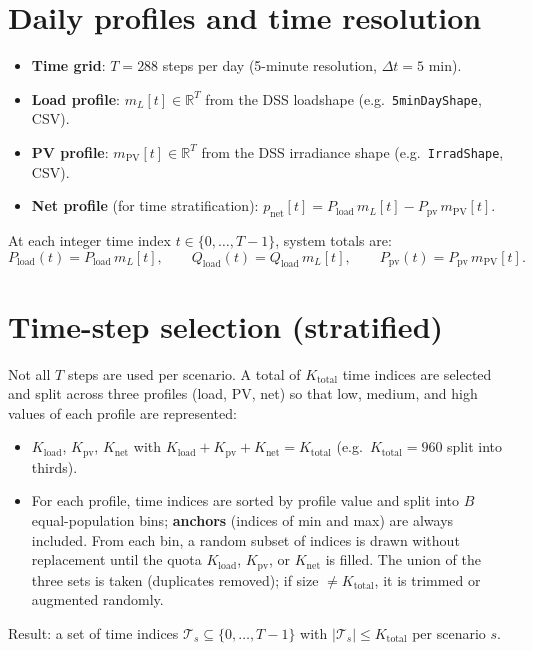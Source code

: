 \documentclass[11pt]{article}
\begin{document}
\section{Daily profiles and time resolution}

\begin{itemize}[noitemsep]
  \item \textbf{Time grid}: $T = 288$ steps per day (5-minute resolution, $\Delta t = 5$ min).
  \item \textbf{Load profile}: $m_L[t] \in \mathbb{R}^T$ from the DSS loadshape (e.g.\ \texttt{5minDayShape}, CSV).
  \item \textbf{PV profile}: $m_{\mathrm{PV}}[t] \in \mathbb{R}^T$ from the DSS irradiance shape (e.g.\ \texttt{IrradShape}, CSV).
  \item \textbf{Net profile} (for time stratification): $p_{\mathrm{net}}[t] = P_{\mathrm{load}}\, m_L[t] - P_{\mathrm{pv}}\, m_{\mathrm{PV}}[t]$.
\end{itemize}

At each integer time index $t \in \{0,\ldots,T-1\}$, system totals are:
\begin{equation}
  P_{\mathrm{load}}(t) = P_{\mathrm{load}}\, m_L[t], \qquad
  Q_{\mathrm{load}}(t) = Q_{\mathrm{load}}\, m_L[t], \qquad
  P_{\mathrm{pv}}(t) = P_{\mathrm{pv}}\, m_{\mathrm{PV}}[t].
\end{equation}

\section{Time-step selection (stratified)}

Not all $T$ steps are used per scenario. A total of $K_{\mathrm{total}}$ time indices are selected and split across three profiles (load, PV, net) so that low, medium, and high values of each profile are represented:
\begin{itemize}[noitemsep]
  \item $K_{\mathrm{load}}$, $K_{\mathrm{pv}}$, $K_{\mathrm{net}}$ with $K_{\mathrm{load}} + K_{\mathrm{pv}} + K_{\mathrm{net}} = K_{\mathrm{total}}$ (e.g.\ $K_{\mathrm{total}} = 960$ split into thirds).
  \item For each profile, time indices are sorted by profile value and split into $B$ equal-population bins; \textbf{anchors} (indices of min and max) are always included. From each bin, a random subset of indices is drawn without replacement until the quota $K_{\mathrm{load}}$, $K_{\mathrm{pv}}$, or $K_{\mathrm{net}}$ is filled. The union of the three sets is taken (duplicates removed); if size $\ne K_{\mathrm{total}}$, it is trimmed or augmented randomly.
\end{itemize}
Result: a set of time indices $\mathcal{T}_s \subseteq \{0,\ldots,T-1\}$ with $|\mathcal{T}_s| \le K_{\mathrm{total}}$ per scenario $s$.
\end{document}
